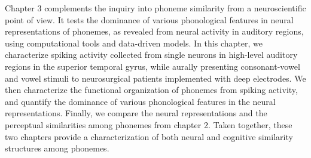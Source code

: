 Chapter 3 complements the inquiry into phoneme similarity from a neuroscientific point of view. It tests the dominance of various phonological features in neural representations of phonemes, as revealed from neural activity in auditory regions, using computational tools and data-driven models. In this chapter, we characterize spiking activity collected from single neurons in high-level auditory regions in the superior temporal gyrus, while aurally presenting consonant-vowel and vowel stimuli to neurosurgical patients implemented with deep electrodes. We then characterize the functional organization of phonemes from spiking activity, and quantify the dominance of various phonological features in the neural representations. Finally, we compare the neural representations and the perceptual similarities among phonemes from chapter 2. Taken together, these two chapters provide a characterization of both neural and cognitive similarity structures among phonemes.